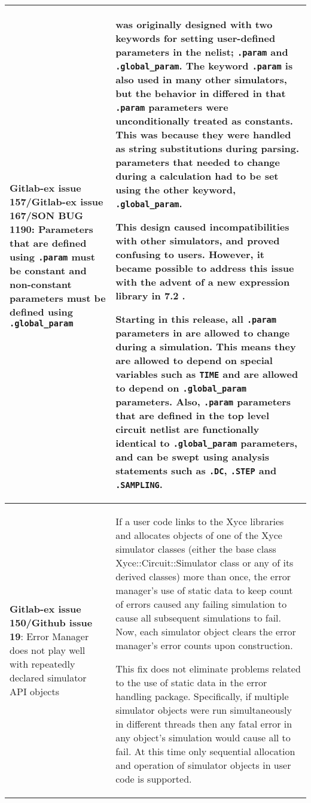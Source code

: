 {\begin{longtable}[h] {>{\raggedright\small}m{2in}|>{\raggedright\let\\\tabularnewline\small}m{3.5in}}
\textbf{Gitlab-ex issue 157/Gitlab-ex issue 167/SON BUG 1190}: Parameters that are defined using \texttt{.param} must be constant and non-constant parameters must be defined using \texttt{.global\_param} &
\Xyce{} was originally designed with two keywords for setting
user-defined parameters in the nelist; \texttt{.param}
and \texttt{.global\_param}.  The keyword \texttt{.param} is also used
in many other simulators, but the behavior in \Xyce{} differed in
that \texttt{.param} parameters were unconditionally treated as
constants.  This was because they were handled as string substitutions
during parsing.  \Xyce{} parameters that needed to change during a
calculation had to be set using the other
keyword, \texttt{.global\_param}.

This design caused incompatibilities with other simulators, and proved
confusing to users.  However, it became possible to address this issue
with the advent of a new expression library in \Xyce{} 7.2 .

Starting in this release, all \texttt{.param} parameters in \Xyce{}
are allowed to change during a simulation. This means they are allowed
to depend on special variables such as \texttt{TIME} and are allowed
to depend on \texttt{.global\_param} parameters.
Also, \texttt{.param} parameters that are defined in the top level
circuit netlist are functionally identical to
\texttt{.global\_param} parameters, and can be swept using
analysis statements such as \texttt{.DC}, \texttt{.STEP}
and \texttt{.SAMPLING}.
  \\ \hline

\textbf{Gitlab-ex issue 150/Github issue 19}: Error Manager does not play well with repeatedly declared simulator API objects &
If a user code links to the Xyce libraries and allocates objects of
one of the Xyce simulator classes (either the base class
Xyce::Circuit::Simulator class or any of its derived classes) more
than once, the error manager's use of static data to keep count of
errors caused any failing simulation to cause all subsequent
simulations to fail.  Now, each simulator object clears the error
manager's error counts upon construction.

This fix does not eliminate problems related to the use of static data
in the error handling package.  Specifically, if multiple simulator
objects were run simultaneously in different threads then any fatal
error in any object's simulation would cause all to fail.  At this
time only sequential allocation and operation of simulator objects in
user code is supported. \\ \hline


\end{longtable}}
